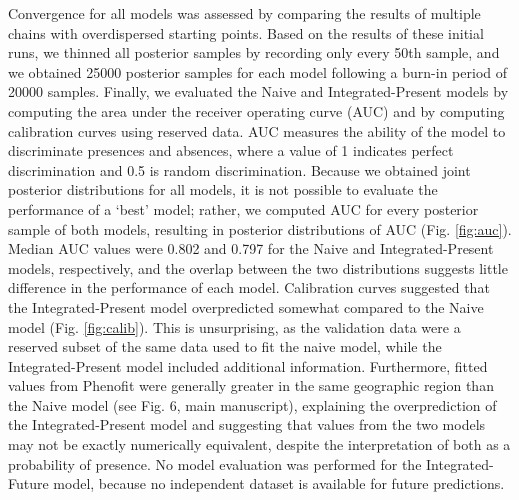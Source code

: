 \documentclass[11pt]{article}
\begin{document}
Convergence for all models was assessed by comparing the results of multiple chains with overdispersed starting points.
Based on the results of these initial runs, we thinned all posterior samples by recording only every 50th sample, and we obtained 25000 posterior samples for each model following a burn-in period of 20000 samples.
Finally, we evaluated the Naive and Integrated-Present models by computing the area under the receiver operating curve (AUC) and by computing calibration curves using reserved data.
AUC measures the ability of the model to discriminate presences and absences, where a value of 1 indicates perfect discrimination and 0.5 is random discrimination.
Because we obtained joint posterior distributions for all models, it is not possible to evaluate the performance of a `best' model; rather, we computed AUC for every posterior sample of both models, resulting in posterior distributions of AUC (Fig. \ref{fig:auc}).
Median AUC values were 0.802 and 0.797 for the Naive and Integrated-Present models, respectively, and the overlap between the two distributions suggests little difference in the performance of each model.
Calibration curves suggested that the Integrated-Present model overpredicted somewhat compared to the Naive model (Fig. \ref{fig:calib}).
This is unsurprising, as the validation data were a reserved subset of the same data used to fit the naive model, while the Integrated-Present model included additional information.
Furthermore, fitted values from Phenofit were generally greater in the same geographic region than the Naive model (see Fig. 6, main manuscript), explaining the overprediction of the Integrated-Present model and suggesting that values from the two models may not be exactly numerically equivalent, despite the interpretation of both as a probability of presence.
No model evaluation was performed for the Integrated-Future model, because no independent dataset is available for future predictions.
\end{document}
